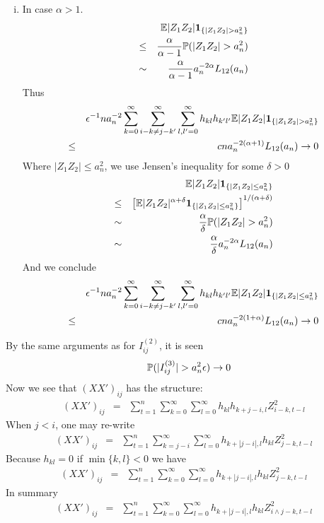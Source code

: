 \documentclass{article}
\begin{document}
\begin{enumerate}[i)]
\item In case $\alpha > 1$.
  \begin{eqnarray*}
    && \mathbb{E} |Z_1 Z_2| \mathbf{1}_{\{|Z_1 Z_2| > a_n^2\}} \\
    &\leq& {\alpha \over \alpha - 1} \mathbb{P}(|Z_1 Z_2| > a_n^2) \\
    &\sim& {\alpha \over \alpha - 1} a_n^{-2\alpha} L_{12}(a_n)
  \end{eqnarray*}
  Thus
  \begin{eqnarray*}
    && \epsilon^{-1} n a_n^{-2} \sum_{k=0}^\infty \sum_{i-k \neq j-k'}^\infty
    \sum_{l,l'=0}^\infty h_{kl} h_{k'l'} \mathbb{E} |Z_1 Z_2| \mathbf{1}_{\{|Z_1 Z_2| >
      a_n^2\}} \\
    &\leq& c n a_n^{-2(\alpha + 1)}L_{12}(a_n) \to 0
  \end{eqnarray*}
  Where $|Z_1 Z_2| \leq a_n^2 $, we use Jensen's inequality for some $\delta > 0$
  \begin{eqnarray*}
    && \mathbb{E} |Z_1 Z_2| \mathbf{1}_{\{|Z_1 Z_2| \leq a_n^2\}} \\
    &\leq& \left[
      \mathbb{E} |Z_1 Z_2|^{\alpha + \delta} \mathbf{1}_{\{|Z_1 Z_2| \leq a_n^2\}}
      \right]^{1/(\alpha + \delta)}\\
    &\sim& {\alpha \over \delta} \mathbb{P}(|Z_1 Z_2| > a_n^2) \\
    &\sim& {\alpha \over \delta} a_n^{-2\alpha} L_{12}(a_n) \\
  \end{eqnarray*}
  And we conclude
  \begin{eqnarray*}
    && \epsilon^{-1} n a_n^{-2} \sum_{k=0}^\infty \sum_{i-k \neq j-k'}^\infty
    \sum_{l,l'=0}^\infty h_{kl} h_{k'l'}
      \mathbb{E} |Z_1 Z_2| \mathbf{1}_{\{|Z_1 Z_2| \leq a_n^2\}} \\
    &\leq& cn a_n^{-2(1 + \alpha)} L_{12}(a_n) \to 0
  \end{eqnarray*}
\end{enumerate}
By the same arguments as for $I^{(2)}_{ij}$, it is seen
\begin{eqnarray*}
  && \mathbb{P}(|I^{(3)}_{ij}| > a_n^2 \epsilon) \to 0
\end{eqnarray*}
Now we see that $(XX')_{ij}$ has the structure:
\begin{eqnarray*}
  (XX')_{ij} &=& \sum_{t=1}^n \sum_{k=0}^\infty \sum_{l=0}^\infty
  h_{kl} h_{k+j-i,l} Z_{i-k, t-l}^2
\end{eqnarray*}
When $j < i$, one may re-write
\begin{eqnarray*}
  (XX')_{ij} &=& \sum_{t=1}^n \sum_{k=j-i}^\infty \sum_{l=0}^\infty
  h_{k+|j-i|,l} h_{kl} Z_{j-k, t-l}^2
\end{eqnarray*}
Because $h_{kl} = 0$ if $\min\{k,l\} < 0$ we have
\begin{eqnarray*}
  (XX')_{ij} &=& \sum_{t=1}^n \sum_{k=0}^\infty \sum_{l=0}^\infty
  h_{k+|j-i|,l} h_{kl} Z_{j-k, t-l}^2
\end{eqnarray*}
In summary
\begin{eqnarray*}
  (XX')_{ij} &=& \sum_{t=1}^n \sum_{k=0}^\infty \sum_{l=0}^\infty
  h_{k+|j-i|,l} h_{kl} Z_{i \wedge j -k, t-l}^2
\end{eqnarray*}


\end{document}
